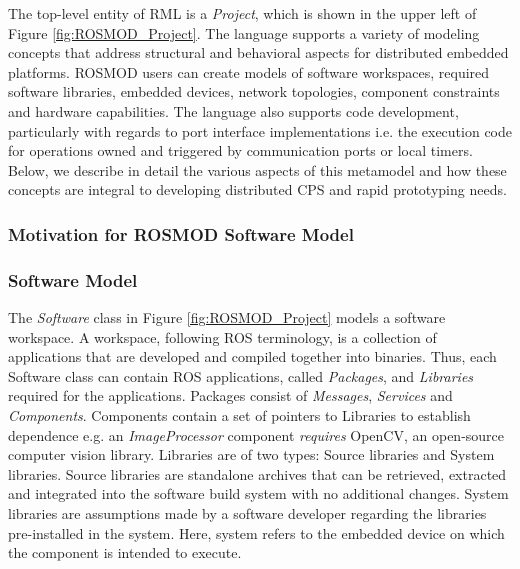 The top-level entity of RML is a \emph{Project}, which is shown in the upper left of Figure \ref{fig:ROSMOD_Project}.  The language supports a variety of modeling concepts that address structural and behavioral aspects for distributed embedded platforms. ROSMOD users can create models of software workspaces, required software libraries, embedded devices, network topologies, component constraints and hardware capabilities. The language also supports code development, particularly with regards to port interface implementations i.e. the execution code for operations owned and triggered by communication
ports or local timers. Below, we describe in detail the various aspects of this metamodel and how these concepts are integral to developing distributed CPS and rapid prototyping needs.

\subsubsection{Motivation for ROSMOD Software Model}

\subsubsection{Software Model}

The \emph{Software} class in Figure \ref{fig:ROSMOD_Project} models a
software workspace. A workspace, following ROS terminology, is a
collection of applications that are developed and compiled together
into binaries. Thus, each Software class can contain ROS applications,
called \emph{Packages}, and \emph{Libraries} required for the
applications. Packages consist of \emph{Messages}, \emph{Services} and
\emph{Components}. Components contain a set of pointers to Libraries
to establish dependence e.g. an \emph{ImageProcessor} component
\emph{requires} OpenCV, an open-source computer vision
library. Libraries are of two types: Source libraries and System
libraries. Source libraries are standalone archives that can be
retrieved, extracted and integrated into the software build system
with no additional changes. System libraries are assumptions made by a
software developer regarding the libraries pre-installed in the
system. Here, system refers to the embedded device on which the
component is intended to execute.


